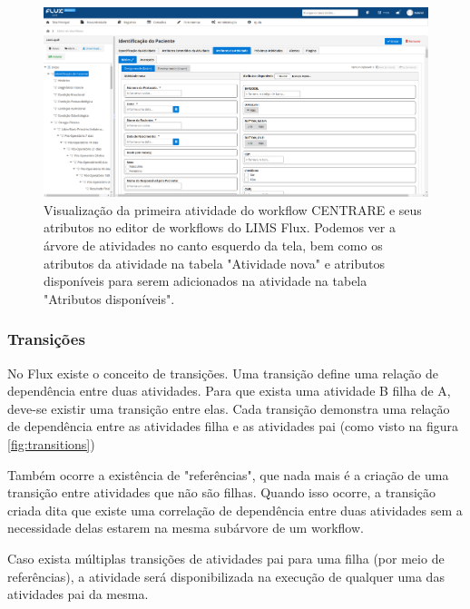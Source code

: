 \begin{figure}
    \centering
    \includegraphics[width=1\textwidth]{imgs/Flux/Workflows/Editor/editor_centrare.png}
    \caption{Visualização da primeira atividade do workflow CENTRARE e seus atributos no editor de workflows do LIMS Flux. Podemos ver a árvore de atividades no canto esquerdo da tela, bem como os atributos da atividade na tabela "Atividade nova" e atributos disponíveis para serem adicionados na atividade na tabela "Atributos disponíveis".}
    \label{fig:editor_centrare}
\end{figure}

\subsubsection{Transições} \label{sec:transitions}

No Flux existe o conceito de transições. Uma transição define uma relação de dependência entre duas atividades. Para que exista uma atividade B filha de A, deve-se existir uma transição entre elas. Cada transição demonstra uma relação de dependência entre as atividades filha e as atividades pai (como visto na figura \ref{fig:transitions})

Também ocorre a existência de "referências", que nada mais é a criação de uma transição entre atividades que não são filhas. Quando isso ocorre, a transição criada dita que existe uma correlação de dependência entre duas atividades sem a necessidade delas estarem na mesma subárvore de um workflow.

Caso exista múltiplas transições de atividades pai para uma filha (por meio de referências), a atividade será disponibilizada na execução de qualquer uma das atividades pai da mesma.


